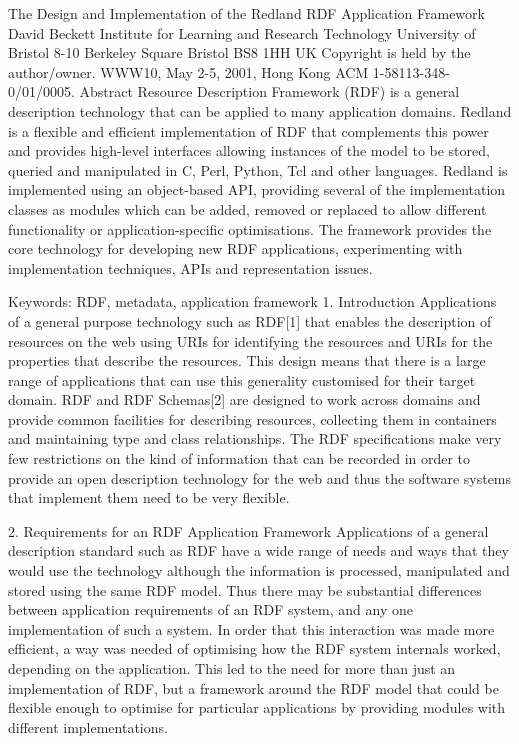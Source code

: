 \documentclass[11pt]{article}
\begin{document}
    The Design and Implementation of the Redland RDF Application Framework
    David Beckett
    Institute for Learning and Research Technology
    University of Bristol
    8-10 Berkeley Square
    Bristol
    BS8 1HH
    UK
    Copyright is held by the author/owner.
    WWW10, May 2-5, 2001, Hong Kong
    ACM 1-58113-348-0/01/0005.
    Abstract
    Resource Description Framework (RDF) is a general description technology that can be applied to many application domains. Redland is a flexible and efficient implementation of RDF that complements this power and provides high-level interfaces allowing instances of the model to be stored, queried and manipulated in C, Perl, Python, Tcl and other languages. Redland is implemented using an object-based API, providing several of the implementation classes as modules which can be added, removed or replaced to allow different functionality or application-specific optimisations. The framework provides the core technology for developing new RDF applications, experimenting with implementation techniques, APIs and representation issues.

    Keywords: RDF, metadata, application framework
    1. Introduction
    Applications of a general purpose technology such as RDF[1] that enables the description of resources on the web using URIs for identifying the resources and URIs for the properties that describe the resources. This design means that there is a large range of applications that can use this generality customised for their target domain. RDF and RDF Schemas[2] are designed to work across domains and provide common facilities for describing resources, collecting them in containers and maintaining type and class relationships. The RDF specifications make very few restrictions on the kind of information that can be recorded in order to provide an open description technology for the web and thus the software systems that implement them need to be very flexible.

    2. Requirements for an RDF Application Framework
    Applications of a general description standard such as RDF have a wide range of needs and ways that they would use the technology although the information is processed, manipulated and stored using the same RDF model. Thus there may be substantial differences between application requirements of an RDF system, and any one implementation of such a system. In order that this interaction was made more efficient, a way was needed of optimising how the RDF system internals worked, depending on the application. This led to the need for more than just an implementation of RDF, but a framework around the RDF model that could be flexible enough to optimise for particular applications by providing modules with different implementations.
\end{document}
